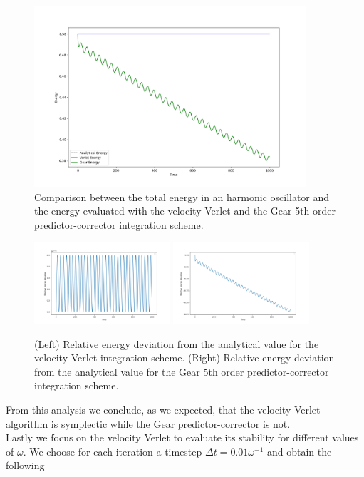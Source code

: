 \begin{figure}[H]
    \centering
    \includegraphics[width=0.9\textwidth]{FIG/ex9/energy_comparison.png}
    \caption{Comparison between the total energy in an harmonic oscillator and the energy evaluated with the velocity Verlet and the Gear 5th order predictor-corrector integration scheme.}
    \label{ex9:energy_comparison}
\end{figure}

\begin{figure}[H]
    \centering
    \includegraphics[width=0.45\textwidth]{FIG/ex9/verlet_energy_dev.png}
    \hspace{0.05\textwidth} %
    \includegraphics[width=0.45\textwidth]{FIG/ex9/gear_energy_dev.png}
    \caption{(Left) Relative energy deviation from the analytical value for the velocity Verlet integration scheme. (Right) Relative energy deviation from the analytical value for the Gear 5th order predictor-corrector integration scheme.}
    \label{fig:side_by_side}
\end{figure}

From this analysis we conclude, as we expected, that the velocity Verlet algorithm is symplectic while the Gear predictor-corrector is not. \\
Lastly we focus on the velocity Verlet to evaluate its stability for different values of $\omega$. We choose for each iteration a timestep $\Delta t= 0.01\omega^{-1}$ and obtain the following